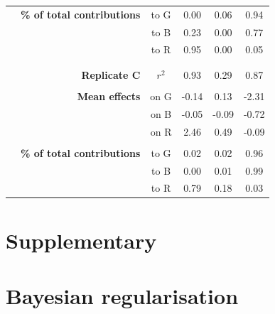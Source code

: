 \documentclass[11pt, oneside]{article}
\newcommand{\beginsupplement}{%
        \setcounter{table}{0}
        \renewcommand{\thetable}{S\arabic{table}}%
        \setcounter{figure}{0}
        \renewcommand{\thefigure}{S\arabic{figure}}%
     }
\begin{document}
\begin{table}[H]
\begin{center}
\begin{tabular}{rrcccc}
	& \textbf{\% of total contributions} 
    &   to G &  0.00 &  0.06 &  0.94 \\ 
    & & to B &  0.23 &  0.00 &  0.77 \\
    & & to R &  0.95 &  0.00 &  0.05 \\
	& \\
	\hline
	& \\
    & \textbf{Replicate C} & $r^2$  &  0.93 & 0.29 & 0.87 \\
	& \\
	& \textbf{Mean effects} 
    &   on G & -0.14 &  0.13 & -2.31 \\
    & & on B & -0.05 & -0.09 & -0.72 \\
    & & on R &  2.46 &  0.49 & -0.09 \\
	& \\
	& \textbf{\% of total contributions} 
    &   to G &  0.02 &  0.02 &  0.96 \\
    & & to B &  0.00 &  0.01 &  0.99 \\
    & & to R &  0.79 &  0.18 &  0.03 \\
\end{tabular}
\end{center}
\end{table}
\newpage

\newpage
\section{Supplementary}
\appendix
\beginsupplement

\section{Bayesian regularisation}
\end{document}
